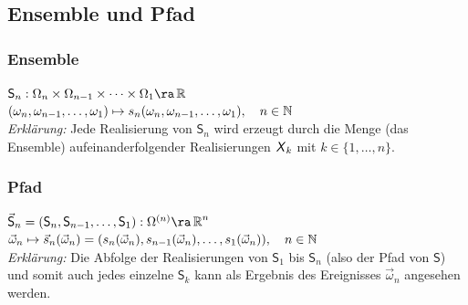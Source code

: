 \documentclass[6pt,a4paper]{scrartcl}
\begin{document}
\begin{multicols*}{4}
{		\subsection{Ensemble und Pfad}
			\subsubsection{Ensemble}
			$\textsf{S}_n : \Omega_n \times \Omega_{n-1} \times \dots \times \Omega_1 \ra \R$\\
			$(\omega_n,\omega_{n-1},\dots,\omega_1) \mapsto s_n(\omega_n,\omega_{n-1},\dots,\omega_1), \quad n \in \operatorname{\mathbb N}$\\
			\emph{Erklärung:} Jede Realisierung von $\textsf{S}_n$ wird erzeugt durch die Menge (das Ensemble) aufeinanderfolgender Realisierungen $\operatorname{\textsf{\textit{X}}}_k$ mit $k \in \{1,\dots,n\}$.
			
			\subsubsection{Pfad}
			$\vec{\textsf{S}}_n = (\textsf{S}_n,\textsf{S}_{n-1},\dots,\textsf{S}_1) : \Omega^{(n)} \ra \R^n$\\
			$\vec{\omega}_n \mapsto \vec{s}_n(\vec{\omega}_n) = (s_n(\vec{\omega}_n),s_{n-1}(\vec{\omega}_n),\dots,s_1(\vec{\omega}_n)), \quad n \in \operatorname{\mathbb N}$\\
			\emph{Erklärung:} Die Abfolge der Realisierungen von $\textsf{S}_1$ bis $\textsf{S}_n$ (also der Pfad von $\textsf{S}$) und somit auch jedes einzelne $\textsf{S}_k$ kann als Ergebnis des Ereignisses $\vec{\omega}_n$ angesehen werden.
	}



\end{multicols*}
\end{document}
